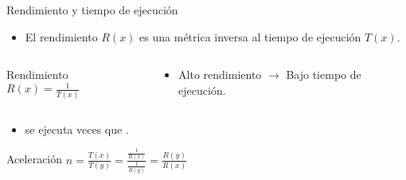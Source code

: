 \begin{frame}[t]{Rendimiento y tiempo de ejecución}
\begin{itemize}
  \item El rendimiento $R(x)$ es una métrica inversa al tiempo de 
        ejecución $T(x)$.
\end{itemize}
\begin{columns}
\begin{column}{.4\textwidth}
\begin{block}{Rendimiento}
\begin{math}
R(x) = \frac{1}{T(x)}
\end{math}
\end{block}
\end{column}
\begin{column}{.6\textwidth}
\begin{itemize}
  \item Alto rendimiento $\rightarrow$ Bajo tiempo de ejecución.
\end{itemize}
\end{column}
\end{columns}
\begin{itemize}
  \item {} se ejecuta  veces  que .
\end{itemize}
\begin{block}{Aceleración}
\begin{math}
n=\frac{T(x)}{T(y)}=
\frac{
\frac{1}{R(x)}
}{
\frac{1}{R(y)}
}
=
\frac{R(y)}{R(x)}
\end{math}
\end{block}
\end{frame}

